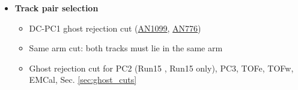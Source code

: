 \begin{description}
\begin{itemize}
            \item \textbf{Track pair selection}
					\begin{itemize}
                  \item DC-PC1 ghost rejection cut (\href{https://phenix-intra.sdcc.bnl.gov/phenix/WWW/p/draft/nihashi/main.pdf}{AN1099}, \href{https://phenix-intra.sdcc.bnl.gov/phenix/WWW/p/draft/chujo/PPG101/AN_pp_paper/draft_AN.pdf}{AN776})
						\item Same arm cut: both tracks must lie in the same arm
                  \item Ghost rejection cut for PC2 (Run15 \pAl, Run15 \pAu only), PC3, TOFe, TOFw, EMCal, Sec. \ref{sec:ghost_cuts}
					\end{itemize}
			\end{itemize}
	\end{description}
